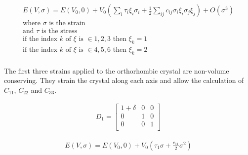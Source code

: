 \begin{equation}
  \begin{split}
  E(V,\sigma) = E(V_{0},0) + V_{0} \left( \sum_{i} \tau_i \xi_i \sigma_i + \frac{1}{2} \sum_{ij} c_{ij} \sigma_{i} \xi_{i} \sigma_{j} \xi_{j} \right) + O(\sigma^3) \\
\text{where } \sigma \text{ is the strain} \\
\text{and } \tau \text{ is the stress} \\
\text{if the index } k \text{ of } \xi \text{ is } \in {1, 2, 3} \text{ then } \xi_k = 1 \\
\text{if the index } k \text{ of } \xi \text{ is } \in {4, 5, 6} \text{ then } \xi_k = 2 \\
  \end{split}
\end{equation}


The first three strains applied to the orthorhombic crystal are non-volume conserving.  They strain the crystal along each axis and allow the calculation of $C_{11}$, $C_{22}$ and $C_{33}$.



\begin{center}
\begin{minipage}{.35\textwidth}
  \begin{equation}
    \begin{split}
      D_{1} = 
      \begin{bmatrix}
      1 + \delta & 0       & 0             \\
      0          & 1       & 0             \\
      0          & 0       & 1             \\
      \end{bmatrix}
    \end{split}
  \label{eq:distortion1}
  \end{equation}
\end{minipage}
\begin{minipage}{.10\textwidth}
\end{minipage}
\begin{minipage}{.54\textwidth}
  \begin{equation}
    \begin{split}
    E(V,\sigma) = E(V_{0},0) + V_{0} \left( \tau_{1} \sigma + \frac{c_{11}}{2} \sigma^2 \right)
    \end{split}
  \label{eq:distortion1energy}
  \end{equation}
\end{minipage}
\end{center}

